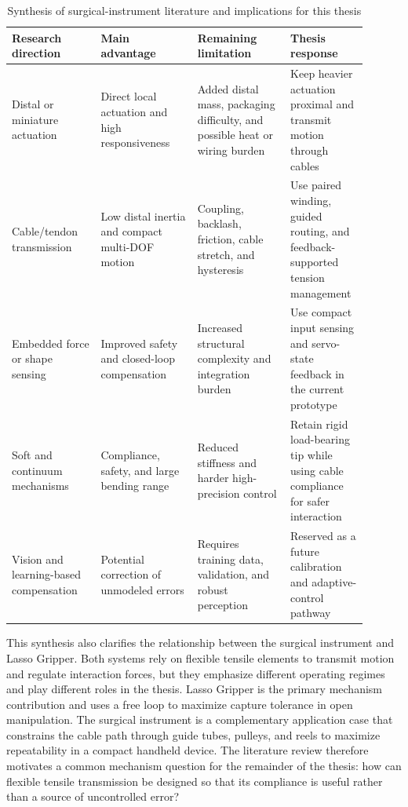 \begin{table}[htbp]
    \centering
    \caption{Synthesis of surgical-instrument literature and implications for this thesis}
    \label{tab:surgical_lit_synthesis}
    \begin{tabular}{p{0.23\linewidth} p{0.25\linewidth} p{0.24\linewidth} p{0.18\linewidth}}
        \toprule
        Research direction & Main advantage & Remaining limitation & Thesis response \\
        \midrule
        Distal or miniature actuation & Direct local actuation and high responsiveness & Added distal mass, packaging difficulty, and possible heat or wiring burden & Keep heavier actuation proximal and transmit motion through cables \\
        Cable/tendon transmission & Low distal inertia and compact multi-DOF motion & Coupling, backlash, friction, cable stretch, and hysteresis & Use paired winding, guided routing, and feedback-supported tension management \\
        Embedded force or shape sensing & Improved safety and closed-loop compensation & Increased structural complexity and integration burden & Use compact input sensing and servo-state feedback in the current prototype \\
        Soft and continuum mechanisms & Compliance, safety, and large bending range & Reduced stiffness and harder high-precision control & Retain rigid load-bearing tip while using cable compliance for safer interaction \\
        Vision and learning-based compensation & Potential correction of unmodeled errors & Requires training data, validation, and robust perception & Reserved as a future calibration and adaptive-control pathway \\
        \bottomrule
    \end{tabular}
\end{table}

This synthesis also clarifies the relationship between the surgical instrument and Lasso Gripper. Both systems rely on flexible tensile elements to transmit motion and regulate interaction forces, but they emphasize different operating regimes and play different roles in the thesis. Lasso Gripper is the primary mechanism contribution and uses a free loop to maximize capture tolerance in open manipulation. The surgical instrument is a complementary application case that constrains the cable path through guide tubes, pulleys, and reels to maximize repeatability in a compact handheld device. The literature review therefore motivates a common mechanism question for the remainder of the thesis: how can flexible tensile transmission be designed so that its compliance is useful rather than a source of uncontrolled error?

